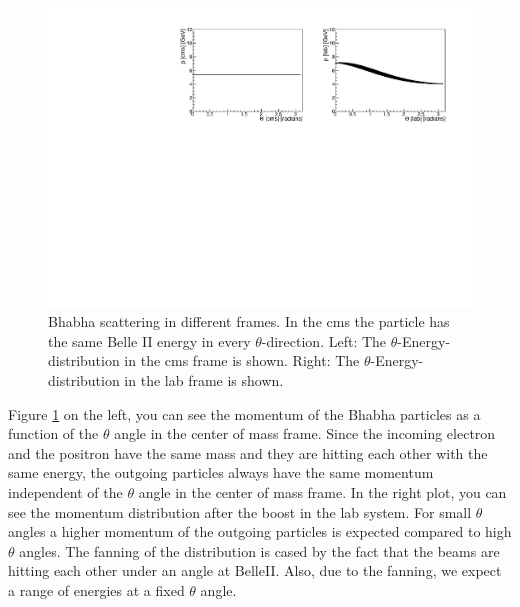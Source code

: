 \documentclass[a4paper,11pt,twosided,final,german,openbib,pdftex,listof=totoc,bibliography=totoc]{scrbook}
\begin{document}
\begin{figure}[h!]
	\centering
\includegraphics[width=\textwidth]{Bilder/CThetaP}
	\caption[$\theta$-Momentum-Distribution In The CMS And LAB Frame]{Bhabha scattering in different frames. In the cms the particle has the same Belle II energy in every $\theta$-direction. Left: The $\theta$-Energy-distribution in the cms frame is shown. Right: The $\theta$-Energy-distribution in the lab frame is shown.}
	\label{fig:BelleIIMomentum}
	
\end{figure}

Figure \ref{fig:BelleIIMomentum} on the left, you can see  the momentum of the Bhabha particles as a function of the $\theta$ angle in the center of mass frame. Since the incoming electron and the positron have the same mass and they are hitting each other with the same energy, the outgoing particles always have the same momentum independent of the $\theta$ angle in the center of mass frame. In the right plot, you can see the momentum distribution after the boost in the lab system. For small $\theta$ angles a higher momentum of the outgoing particles is expected compared to high $\theta$ angles. The fanning of the distribution is cased by the fact that the beams are hitting each other under an angle at BelleII. Also, due to the fanning, we expect a range of energies at a fixed $\theta$ angle.
\end{document}
